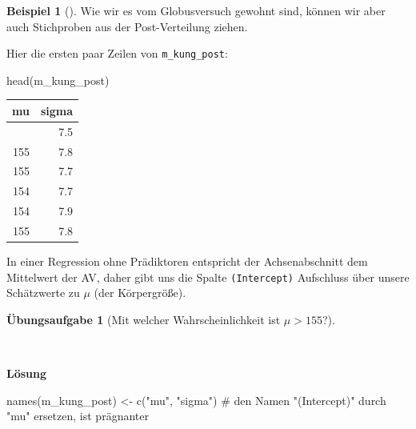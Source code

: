 \documentclass[
  ngerman,
  letterpaper,
  twoside,
  open=any]{scrbook}
\newenvironment{Shaded}{\begin{snugshade}}{\end{snugshade}}
\newcommand{\CommentTok}[1]{\textcolor[rgb]{0.37,0.37,0.37}{#1}}
\newcommand{\FunctionTok}[1]{\textcolor[rgb]{0.28,0.35,0.67}{#1}}
\newcommand{\NormalTok}[1]{\textcolor[rgb]{0.00,0.23,0.31}{#1}}
\newcommand{\OtherTok}[1]{\textcolor[rgb]{0.00,0.23,0.31}{#1}}
\newcommand{\StringTok}[1]{\textcolor[rgb]{0.13,0.47,0.30}{#1}}
\newcounter{none} %
\theoremstyle{definition}
\newtheorem{example}{Beispiel}[chapter]
\theoremstyle{plain}
\theoremstyle{definition}
\newtheorem{exercise}{Übungsaufgabe}[chapter]
\theoremstyle{definition}
\theoremstyle{remark}
\begin{document}
\begin{example}[]
Wie wir es vom Globusversuch gewohnt sind, können wir aber auch
Stichproben aus der Post-Verteilung ziehen.

Hier die ersten paar Zeilen von \texttt{m\_kung\_post}:

\begin{Shaded}
\begin{Highlighting}[]
\FunctionTok{head}\NormalTok{(m\_kung\_post)}
\end{Highlighting}
\end{Shaded}

{\def\LTcaptype{none} %
\begin{longtable}[]{@{}rr@{}}
\toprule\noalign{}
mu & sigma \\
\midrule\noalign{}
\endhead
\bottomrule\noalign{}
\endlastfoot
154 & 7.5 \\
155 & 7.8 \\
155 & 7.7 \\
154 & 7.7 \\
154 & 7.9 \\
155 & 7.8 \\
\end{longtable}
}

In einer Regression ohne Prädiktoren entspricht der Achsenabschnitt dem
Mittelwert der AV, daher gibt uns die Spalte \texttt{(Intercept)}
Aufschluss über unsere Schätzwerte zu \(\mu\) (der Körpergröße).

\begin{exercise}[Mit welcher Wahrscheinlichkeit ist
\(\mu>155\)?]\protect\hypertarget{exr-kung1}{}\label{exr-kung1}

~

\begin{tcolorbox}[enhanced jigsaw, arc=.35mm, bottomrule=.15mm, breakable, colback=white, colframe=quarto-callout-tip-color-frame, left=2mm, leftrule=.75mm, opacityback=0, rightrule=.15mm, toprule=.15mm]

\vspace{-3mm}\textbf{Lösung}\vspace{3mm}

\begin{Shaded}
\begin{Highlighting}[]

\FunctionTok{names}\NormalTok{(m\_kung\_post) }\OtherTok{\textless{}{-}} 
  \FunctionTok{c}\NormalTok{(}\StringTok{"mu"}\NormalTok{, }\StringTok{"sigma"}\NormalTok{)  }\CommentTok{\# den Namen "(Intercept)" durch "mu" ersetzen, ist prägnanter}


\end{Highlighting}
\end{Shaded}
\end{tcolorbox}
\end{exercise}
\end{example}
\end{document}

